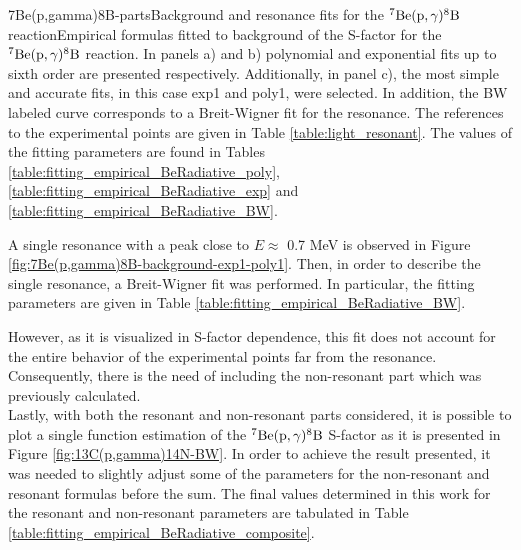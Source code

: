 \documentclass[openany]{book}
\begin{document}
{7Be(p,gamma)8B-parts}{Background and resonance fits for the $\mathrm{{}^{7}Be(p, \gamma){}^{8}B}$ reaction}{Empirical formulas fitted to background of the S-factor for the $\mathrm{{}^{7}Be(p, \gamma){}^{8}B}$ reaction. In panels a) and b) polynomial and exponential fits up to sixth order are presented respectively. Additionally, in panel c), the most simple and accurate fits, in this case exp1 and poly1, were selected. In addition, the BW labeled curve corresponds to a Breit-Wigner fit for the resonance.  The references to the experimental points are given in Table \ref{table:light_resonant}. The values of the fitting parameters are found in Tables \ref{table:fitting_empirical_BeRadiative_poly}, \ref{table:fitting_empirical_BeRadiative_exp} and  \ref{table:fitting_empirical_BeRadiative_BW}.}





A single resonance with a peak close to $E \approx$ 0.7 MeV is observed in Figure \ref{fig:7Be(p,gamma)8B-background-exp1-poly1}. Then, in order to describe the single resonance, a Breit-Wigner fit was performed. In particular, the fitting parameters are given in Table \ref{table:fitting_empirical_BeRadiative_BW}.

However, as it is visualized in S-factor dependence, this fit does not account for the entire behavior of the experimental points far from the resonance. Consequently, there is the need of including the non-resonant part which was previously calculated. \\

Lastly, with both the resonant and non-resonant parts considered, it is possible to plot a single function estimation of the $\mathrm{{}^{7}Be(p, \gamma){}^{8}B}$ S-factor as it is presented in Figure \ref{fig:13C(p,gamma)14N-BW}. In order to achieve the result presented, it was needed to slightly adjust some of the parameters for the non-resonant and resonant formulas before the sum. The final values determined in this work for the resonant and non-resonant parameters are tabulated in Table \ref{table:fitting_empirical_BeRadiative_composite}. \\
\end{document}
